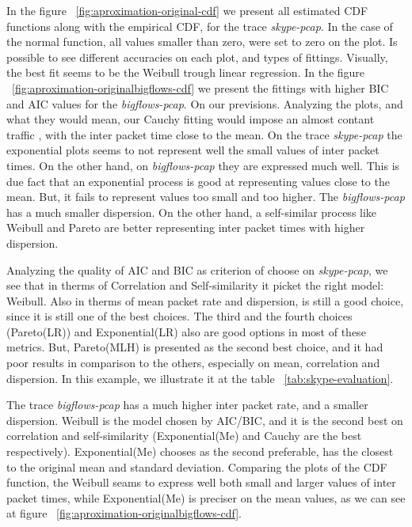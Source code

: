 In the figure ~\ref{fig:aproximation-original-cdf} we present all estimated CDF functions along with the empirical CDF, for the trace \textit{skype-pcap}. In the case of the normal function, all values smaller than zero, were set to zero on the plot. Is possible to see different accuracies on each plot, and types of fittings. Visually, the best fit seems to be the Weibull trough linear regression. In the figure ~\ref{fig:aproximation-originalbigflows-cdf} we present the fittings with higher BIC and AIC values for the \textit{bigflows-pcap}. On our previsions. Analyzing the plots, and what they would mean, our Cauchy fitting would impose an almost contant traffic , with the inter packet time close to the mean. On the trace \textit{skype-pcap} the exponential plots seems to not represent well the small values of inter packet times. On the other hand, on \textit{bigflows-pcap} they are expressed much well. This is due fact that an exponential process is good at representing values close to the mean. But, it fails to represent values too small and too higher. The \textit{bigflows-pcap}  has a much smaller dispersion. On the other hand, a self-similar process like Weibull and Pareto are better representing inter packet times with higher dispersion. 

Analyzing the quality of AIC and BIC as criterion of choose on \textit{skype-pcap}, we see that in therms of Correlation and Self-similarity it picket the right model: Weibull. Also in therms of mean packet rate and dispersion, is still a good choice, since it is still one of the best choices. The third and the fourth choices (Pareto(LR)) and Exponential(LR) also are good options in most of these metrics. But, Pareto(MLH) is presented as the second best choice, and it had poor results in comparison to the others, especially on mean, correlation and dispersion. In this example, we illustrate it at the table ~\ref{tab:skype-evaluation}.

The trace \textit{bigflows-pcap} has a much higher inter packet rate, and a smaller dispersion. Weibull is the model chosen by AIC/BIC, and it is the second best on correlation and self-similarity (Exponential(Me) and Cauchy are the best respectively). Exponential(Me) chooses as the second preferable, has the closest to the original mean and standard deviation. Comparing the plots of the CDF function, the Weibull seams to express well both small and larger values of inter packet times, while Exponential(Me) is preciser on the mean values, as we can see at figure ~\ref{fig:aproximation-originalbigflows-cdf}. 


